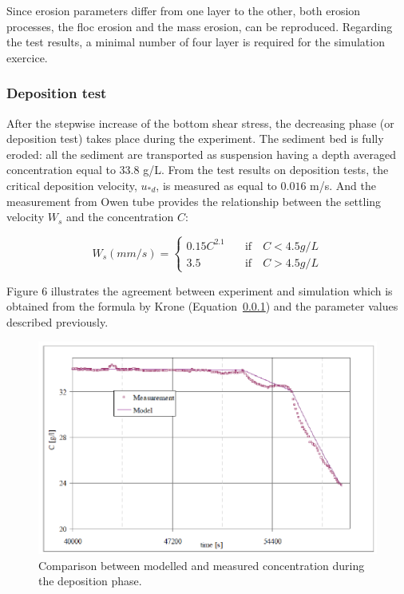 Since erosion parameters differ from one layer to the other, both erosion
processes, the floc erosion and the mass erosion, can be reproduced.
Regarding the test results, a minimal number of four layer is required for
the simulation exercice. 

\subsubsection{Deposition test}

After the stepwise increase of the bottom shear stress, the decreasing phase
(or deposition test) takes place during the experiment. The sediment bed is
fully eroded: all the sediment are transported as suspension having a depth
averaged concentration equal to $33.8$ g/L. From the test results on
deposition tests, the critical deposition velocity, $u_{*d}$, is measured as
equal to $0.016$ m/s. And the measurement from Owen tube provides the
relationship between the settling velocity $W_s$ and the concentration $C$:

\begin{equation*}
W_s (mm/s)=\left\{ 
\begin{array}{cl}
0.15C^{2.1} & \quad \text{if}\quad C < 4.5 g/L \\ 
3.5 & \quad \text{if}\quad C > 4.5g/L
\end{array}
\right. 
\end{equation*}

Figure 6 illustrates the agreement between experiment and simulation which
is obtained from the formula by Krone (Equation~\ref{}) and the parameter values
described previously. 

\begin{figure}[H]
\begin{center}
\includegraphics[scale=0.45,angle=0]{graphics/fig6.png}
\caption{Comparison between modelled and measured concentration during the deposition
phase.}\label{fig:6}
\end{center}
\end{figure}


